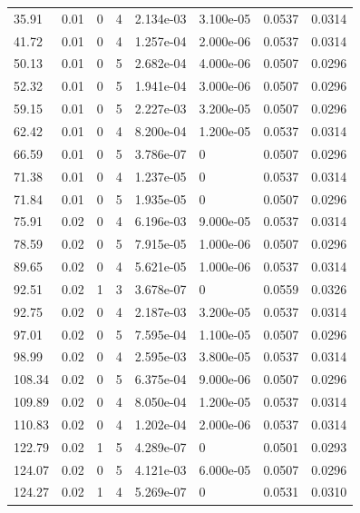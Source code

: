 \documentclass[preview]{standalone}
\begin{document}
{{\begin{tabular}{L{1.2cm}C{1.2cm} C{0.3cm}C{0.5cm} C{1.4cm}C{1.4cm} C{1.4cm}C{1.4cm}}
  35.91  &  0.01  & 0     &  4 &  2.134e-03  & 3.100e-05  & 0.0537 &  0.0314   \\ 
  41.72  &  0.01  & 0     &  4 &  1.257e-04  & 2.000e-06  & 0.0537 &  0.0314   \\ 
  50.13  &  0.01  & 0     &  5 &  2.682e-04  & 4.000e-06  & 0.0507 &  0.0296   \\ 
  52.32  &  0.01  & 0     &  5 &  1.941e-04  & 3.000e-06  & 0.0507 &  0.0296   \\ 
  59.15  &  0.01  & 0     &  5 &  2.227e-03  & 3.200e-05  & 0.0507 &  0.0296   \\ 
  62.42  &  0.01  & 0     &  4 &  8.200e-04  & 1.200e-05  & 0.0537 &  0.0314   \\ 
  66.59  &  0.01  & 0     &  5 &  3.786e-07  & 0  & 0.0507 &  0.0296   \\ 
  71.38  &  0.01  & 0     &  4 &  1.237e-05  & 0  & 0.0537 &  0.0314   \\ 
  71.84  &  0.01  & 0     &  5 &  1.935e-05  & 0  & 0.0507 &  0.0296   \\ 
  75.91  &  0.02  & 0     &  4 &  6.196e-03  & 9.000e-05  & 0.0537 &  0.0314   \\ 
  78.59  &  0.02  & 0     &  5 &  7.915e-05  & 1.000e-06  & 0.0507 &  0.0296   \\ 
  89.65  &  0.02  & 0     &  4 &  5.621e-05  & 1.000e-06  & 0.0537 &  0.0314   \\ 
  92.51  &  0.02  & 1     &  3 &  3.678e-07  & 0  & 0.0559 &  0.0326   \\ 
  92.75  &  0.02  & 0     &  4 &  2.187e-03  & 3.200e-05  & 0.0537 &  0.0314   \\ 
  97.01  &  0.02  & 0     &  5 &  7.595e-04  & 1.100e-05  & 0.0507 &  0.0296   \\ 
  98.99  &  0.02  & 0     &  4 &  2.595e-03  & 3.800e-05  & 0.0537 &  0.0314   \\ 
  108.34  &  0.02  & 0     &  5 &  6.375e-04  & 9.000e-06  & 0.0507 &  0.0296   \\ 
  109.89  &  0.02  & 0     &  4 &  8.050e-04  & 1.200e-05  & 0.0537 &  0.0314   \\ 
  110.83  &  0.02  & 0     &  4 &  1.202e-04  & 2.000e-06  & 0.0537 &  0.0314   \\ 
  122.79  &  0.02  & 1     &  5 &  4.289e-07  & 0  & 0.0501 &  0.0293   \\ 
  124.07  &  0.02  & 0     &  5 &  4.121e-03  & 6.000e-05  & 0.0507 &  0.0296   \\ 
  124.27  &  0.02  & 1     &  4 &  5.269e-07  & 0  & 0.0531 &  0.0310   \\ 

\end{tabular}}}
\end{document}
